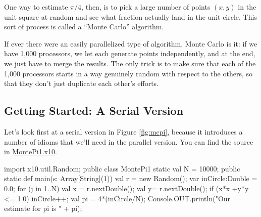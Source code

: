 One way to estimate $\pi/4$, then, is to pick a
large number of points $(x,y)$ in the unit square at random and see what fraction
actually land in the unit circle. This sort of process is called a ``Monte
Carlo'' algorithm.

If ever there 
were an easily parallelized type of algorithm, Monte Carlo is it: if we have 1,000
processors, we let each generate points independently, and at the end, we
just have to merge the results.  The only trick is to make sure that each of the 1,000
processors starts in a way genuinely random with respect to the others, so that
they don't just duplicate each other's efforts. 

\subsection{Getting Started: A Serial Version}
Let's look first at a serial version in Figure \ref{fig:mcpi}, 
because it introduces a number of \Xten{} idioms that we'll need in the
parallel version.  You can find the source in 
\href{http://dist.codehaus.org/x10/documentation/guide/src/montePi/MontePi1.x10}{MontePi1.x10}.
\begin{xtennum}[frame=tb, caption={Serial Monte Carlo Approximation of Pi},label={fig:mcpi},float=tb]
import x10.util.Random; 
public class MontePi1 {
    static val N = 10000; 
    public static def main(s: Array[String](1)) { 
        val r = new Random();   
        var inCircle:Double = 0.0; 
        for (j in 1..N) { 
            val x = r.nextDouble(); 
            val y=  r.nextDouble(); 
            if (x*x +y*y <= 1.0) inCircle++; 
        }  
        val pi = 4*(inCircle/N); 
        Console.OUT.println("Our estimate for pi is " + pi); 
    }
}
\end{xtennum}
